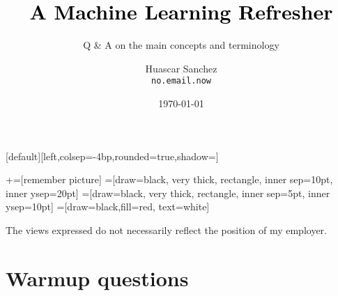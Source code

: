 

\usepackage{framed}
\usepackage[inline]{enumitem}
\usepackage[backend=bibtex]{biblatex}
\usepackage{amssymb}
\usepackage{amsmath}

\newcommand{\norm}[1]{\left\lVert #1 \right\rVert}

\usepackage{multirow}
\usepackage{booktabs}


\title[]{\Huge \textbf{\textcolor{black}{A Machine Learning Refresher}}}
\subtitle{\Large Q \& A on the main concepts and terminology}
\author[HAS]{
\parbox[t]{1.5in}{Huascar Sanchez \\\small\texttt{no.email.now}} %
}

\date{\today}

\makeatletter
{}[default][left,colsep=-4bp,rounded=true,shadow=\beamer@themerounded@shadow]
\makeatother


\newcommand\marktopleft[1]{%
    \tikz[overlay,remember picture]
        \node (marker-#1-a) at (-.3em,.3em) {};%
}
\newcommand\markbottomright[2]{%
    \tikz[overlay,remember picture]
        \node (marker-#1-b) at (0em,0em) {};%
}
+=[remember picture]
 =[draw=black, very thick, rectangle, inner sep=10pt, inner ysep=20pt]
 =[draw=black, very thick, rectangle, inner sep=5pt, inner ysep=10pt]
 =[draw=black,fill=red, text=white]

\begin{frame}
\maketitle
\tiny\hspace{1em}The views expressed do not necessarily reflect the position of my employer.
\end{frame}

\section{Warmup questions}

